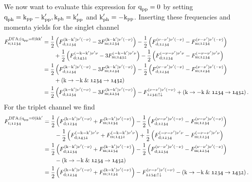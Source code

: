 \documentclass[main.tex]{subfiles}
\begin{document}
We now want to evaluate this expression for $\text{q}_{\text{pp}}=0$ by setting $\text{q}_{\text{ph}}=\text{k}_{\text{pp}}-\text{k}'_{\text{pp}}, \text{k}_{\text{ph}}=\text{k}'_{\text{pp}}$ and $\text{k}'_{\text{ph}}=-\text{k}_{\text{pp}}$. Inserting these frequencies and momenta yields for the singlet channel
\begin{align}
\begin{split}
	F_{\text{s};\mathfrak{1234}}^{\text{D}\Gamma\text{A};(\text{q}_{\text{pp}}=0)\text{k}\text{k}'}&=\frac12\left (F_{\text{d};\mathfrak{1234}}^{(\text{k}-\text{k}')\nu'(-\nu)}-3F_{\text{m};\mathfrak{1234}}^{(\text{k}-\text{k}')\nu'(-\nu)}\right )-\frac12\left (F_{\text{d};\mathfrak{1234}}^{(\nu-\nu')\nu'(-\nu)}-F_{\text{m};\mathfrak{1234}}^{(\nu-\nu')\nu'(-\nu)}\right )\\
	&\qquad+\frac12\left (F_{\text{d};\mathfrak{1432}}^{(-\text{k}-\text{k}')\nu'\nu}-3F_{\text{m};\mathfrak{1432}}^{(-\text{k}-\text{k}')\nu'\nu}\right )-\frac12\left (F_{\text{d};\mathfrak{1234}}^{(-\nu-\nu')\nu'\nu}-F_{\text{m};\mathfrak{1234}}^{(-\nu-\nu')\nu'\nu}\right )\\
	&=\frac12\left (F_{\text{d};\mathfrak{1234}}^{(\text{k}-\text{k}')\nu'(-\nu)}-3F_{\text{m};\mathfrak{1234}}^{(\text{k}-\text{k}')\nu'(-\nu)}\right )-\frac12\left (F_{\text{d};\mathfrak{1234}}^{(\nu-\nu')\nu'(-\nu)}-F_{\text{m};\mathfrak{1234}}^{(\nu-\nu')\nu'(-\nu)}\right )\\
	&\qquad+ \left (\text{k}\rightarrow -\text{k}\;\&\; \mathfrak{1234}\rightarrow\mathfrak{1432}\right )\\
	&=\frac12\left (F_{\text{d};\mathfrak{1234}}^{(\text{k}-\text{k}')\nu'(-\nu)}-3F_{\text{m};\mathfrak{1234}}^{(\text{k}-\text{k}')\nu'(-\nu)}\right )-F_{\mathfrak{1234};\uparrow\downarrow}^{(\nu-\nu')\nu'(-\nu)}+ \left (\text{k}\rightarrow -\text{k}\;\&\; \mathfrak{1234}\rightarrow\mathfrak{1432}\right ).
\end{split}
\end{align}
For the triplet channel we find
\begin{align}
\begin{split}
	F_{\text{t};\mathfrak{1234}}^{\text{D}\Gamma\text{A};(\text{q}_{\text{pp}}=0)\text{k}\text{k}'}&=\frac12\left (F_{\text{d};\mathfrak{1234}}^{(\text{k}-\text{k}')\nu'(-\nu)}+F_{\text{m};\mathfrak{1234}}^{(\text{k}-\text{k}')\nu'(-\nu)}\right )-\frac12\left (F_{\text{d};\mathfrak{1234}}^{(\nu-\nu')\nu'(-\nu)}-F_{\text{m};\mathfrak{1234}}^{(\nu-\nu')\nu'(-\nu)}\right )\\
	&\qquad-\frac12\left (F_{\text{d};\mathfrak{1432}}^{(-\text{k}-\text{k}')\nu'\nu}+F_{\text{m};\mathfrak{1432}}^{(-\text{k}-\text{k}')\nu'\nu}\right )+\frac12\left (F_{\text{d};\mathfrak{1234}}^{(-\nu-\nu')\nu'\nu}-F_{\text{m};\mathfrak{1234}}^{(-\nu-\nu')\nu'\nu}\right )\\
	&=\frac12\left (F_{\text{d};\mathfrak{1234}}^{(\text{k}-\text{k}')\nu'(-\nu)}+F_{\text{m};\mathfrak{1234}}^{(\text{k}-\text{k}')\nu'(-\nu)}\right )-\frac12\left (F_{\text{d};\mathfrak{1234}}^{(\nu-\nu')\nu'(-\nu)}-F_{\text{m};\mathfrak{1234}}^{(\nu-\nu')\nu'(-\nu)}\right )\\
	&\qquad- \left (\text{k}\rightarrow -\text{k}\;\&\; \mathfrak{1234}\rightarrow\mathfrak{1432}\right )\\
	&=\frac12\left (F_{\text{d};\mathfrak{1234}}^{(\text{k}-\text{k}')\nu'(-\nu)}+F_{\text{m};\mathfrak{1234}}^{(\text{k}-\text{k}')\nu'(-\nu)}\right )-F_{\mathfrak{1234};\uparrow\downarrow}^{(\nu-\nu')\nu'(-\nu)}- \left (\text{k}\rightarrow -\text{k}\;\&\; \mathfrak{1234}\rightarrow\mathfrak{1432}\right ).
\end{split}
\end{align}
\end{document}
